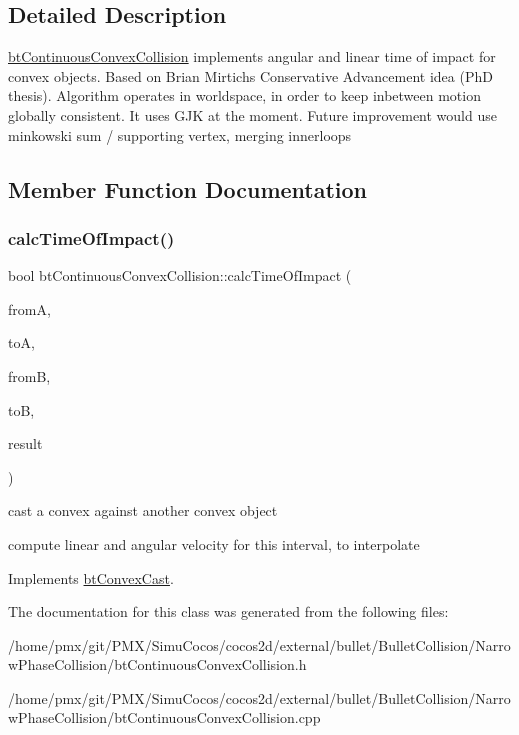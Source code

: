 \subsection{Detailed Description}
\hyperlink{classbtContinuousConvexCollision}{bt\+Continuous\+Convex\+Collision} implements angular and linear time of impact for convex objects. Based on Brian Mirtich\textquotesingle{}s Conservative Advancement idea (PhD thesis). Algorithm operates in worldspace, in order to keep inbetween motion globally consistent. It uses G\+JK at the moment. Future improvement would use minkowski sum / supporting vertex, merging innerloops 

\subsection{Member Function Documentation}
\mbox{\label{classbtContinuousConvexCollision_afc75a57bddfeded52781bbd65ee16f37}} 
\subsubsection{\texorpdfstring{calc\+Time\+Of\+Impact()}{calcTimeOfImpact()}}
{\footnotesize\ttfamily bool bt\+Continuous\+Convex\+Collision\+::calc\+Time\+Of\+Impact (\begin{DoxyParamCaption}\item[{const bt\+Transform \&}]{fromA,  }\item[{const bt\+Transform \&}]{toA,  }\item[{const bt\+Transform \&}]{fromB,  }\item[{const bt\+Transform \&}]{toB,  }\item[{\hyperlink{structbtConvexCast_1_1CastResult}{Cast\+Result} \&}]{result }\end{DoxyParamCaption})\hspace{0.3cm}{\ttfamily [virtual]}}



cast a convex against another convex object 

compute linear and angular velocity for this interval, to interpolate 

Implements \hyperlink{classbtConvexCast_abaf0f25a8cccfcafdaabada83c8d2bfb}{bt\+Convex\+Cast}.



The documentation for this class was generated from the following files\+:\begin{DoxyCompactItemize}
\item 
/home/pmx/git/\+P\+M\+X/\+Simu\+Cocos/cocos2d/external/bullet/\+Bullet\+Collision/\+Narrow\+Phase\+Collision/bt\+Continuous\+Convex\+Collision.\+h\item 
/home/pmx/git/\+P\+M\+X/\+Simu\+Cocos/cocos2d/external/bullet/\+Bullet\+Collision/\+Narrow\+Phase\+Collision/bt\+Continuous\+Convex\+Collision.\+cpp\end{DoxyCompactItemize}
